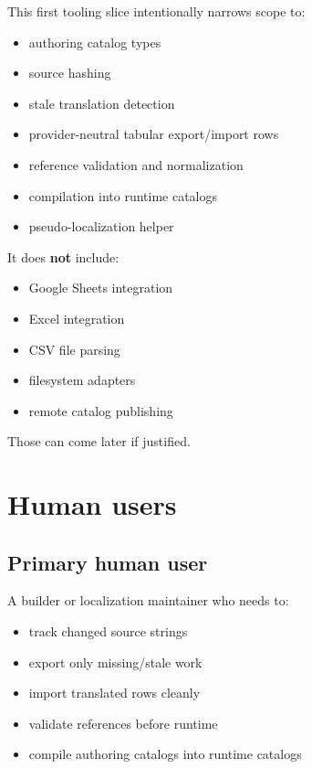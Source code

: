 This first tooling slice intentionally narrows scope to:

\begin{itemize}
\tightlist
\item
  authoring catalog types
\item
  source hashing
\item
  stale translation detection
\item
  provider-neutral tabular export/import rows
\item
  reference validation and normalization
\item
  compilation into runtime catalogs
\item
  pseudo-localization helper
\end{itemize}

It does \textbf{not} include:

\begin{itemize}
\tightlist
\item
  Google Sheets integration
\item
  Excel integration
\item
  CSV file parsing
\item
  filesystem adapters
\item
  remote catalog publishing
\end{itemize}

Those can come later if justified.

\section{Human users}\label{record-189-human-users}

\subsection{Primary human user}\label{record-189-primary-human-user}

A builder or localization maintainer who needs to:

\begin{itemize}
\tightlist
\item
  track changed source strings
\item
  export only missing/stale work
\item
  import translated rows cleanly
\item
  validate references before runtime
\item
  compile authoring catalogs into runtime catalogs
\end{itemize}

